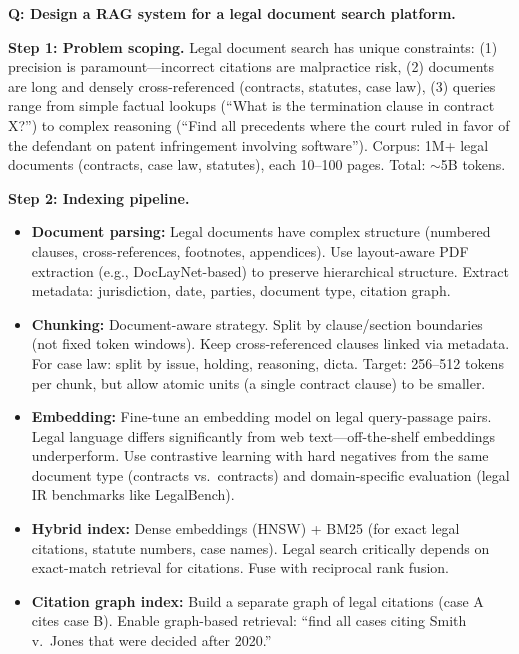 \begin{interviewq}
\textbf{Q: Design a RAG system for a legal document search platform.}

 \quad {} \quad \badgefreq{\freqmed}

\stronganswer

\textbf{Step 1: Problem scoping.} Legal document search has unique constraints: (1) precision is paramount---incorrect citations are malpractice risk, (2) documents are long and densely cross-referenced (contracts, statutes, case law), (3) queries range from simple factual lookups (``What is the termination clause in contract X?'') to complex reasoning (``Find all precedents where the court ruled in favor of the defendant on patent infringement involving software''). Corpus: 1M+ legal documents (contracts, case law, statutes), each 10--100 pages. Total: $\sim$5B tokens.

\textbf{Step 2: Indexing pipeline.}
\begin{itemize}
    \item \textbf{Document parsing:} Legal documents have complex structure (numbered clauses, cross-references, footnotes, appendices). Use layout-aware PDF extraction (e.g., DocLayNet-based) to preserve hierarchical structure. Extract metadata: jurisdiction, date, parties, document type, citation graph.
    \item \textbf{Chunking:} Document-aware strategy. Split by clause/section boundaries (not fixed token windows). Keep cross-referenced clauses linked via metadata. For case law: split by issue, holding, reasoning, dicta. Target: 256--512 tokens per chunk, but allow atomic units (a single contract clause) to be smaller.
    \item \textbf{Embedding:} Fine-tune an embedding model on legal query-passage pairs. Legal language differs significantly from web text---off-the-shelf embeddings underperform. Use contrastive learning with hard negatives from the same document type (contracts vs.\ contracts) and domain-specific evaluation (legal IR benchmarks like LegalBench).
    \item \textbf{Hybrid index:} Dense embeddings (HNSW) + BM25 (for exact legal citations, statute numbers, case names). Legal search critically depends on exact-match retrieval for citations. Fuse with reciprocal rank fusion.
    \item \textbf{Citation graph index:} Build a separate graph of legal citations (case A cites case B). Enable graph-based retrieval: ``find all cases citing Smith v.\ Jones that were decided after 2020.''
\end{itemize}


\end{interviewq}
